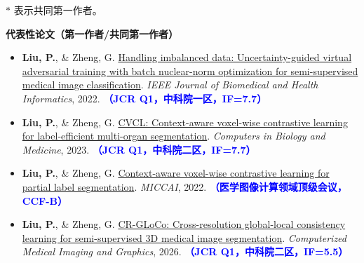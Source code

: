 \noindent $*$ 表示共同第一作者。

{\large\bfseries\sffamily 代表性论文（第一作者/共同第一作者）\par}
\begin{itemize}
\setlength{\itemsep}{0.35em}
\setlength{\parsep}{0pt}
\item \textbf{Liu, P.}, \& Zheng, G. \href{https://doi.org/10.1109/JBHI.2022.3162748}{Handling imbalanced data: Uncertainty-guided virtual adversarial training with batch nuclear-norm optimization for semi-supervised medical image classification}. \textit{IEEE Journal of Biomedical and Health Informatics}, 2022. \textcolor{blue}{\textbf{（JCR Q1，中科院一区，IF=7.7）}}\par
{}
\item \textbf{Liu, P.}, \& Zheng, G. \href{https://doi.org/10.1016/j.compbiomed.2023.106995}{CVCL: Context-aware voxel-wise contrastive learning for label-efficient multi-organ segmentation}. \textit{Computers in Biology and Medicine}, 2023. \textcolor{blue}{\textbf{（JCR Q1，中科院二区，IF=7.7）}}\par
{}
\item \textbf{Liu, P.}, \& Zheng, G. \href{https://doi.org/10.1007/978-3-031-16440-8_62}{Context-aware voxel-wise contrastive learning for partial label segmentation}. \textit{MICCAI}, 2022. \textcolor{blue}{\textbf{（医学图像计算领域顶级会议，CCF-B）}}\par
{}
\item \textbf{Liu, P.}, \& Zheng, G. \href{https://doi.org/10.1016/j.compmedimag.2026.102742}{CR-GLoCo: Cross-resolution global-local consistency learning for semi-supervised 3D medical image segmentation}. \textit{Computerized Medical Imaging and Graphics}, 2026. \textcolor{blue}{\textbf{（JCR Q1，中科院二区，IF=5.5）}}\par

\end{itemize}
